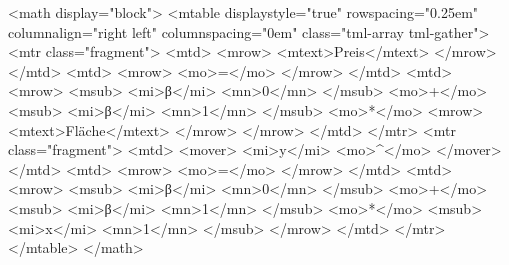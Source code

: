<math display="block">
    <mtable displaystyle="true" rowspacing="0.25em" columnalign="right left" columnspacing="0em" class="tml-array tml-gather">
        <mtr class="fragment">
            <mtd>
                <mrow>
                    <mtext>Preis</mtext>
                </mrow>
            </mtd>
            <mtd>
                <mrow>
                    <mo>=</mo>
                </mrow>
            </mtd>
            <mtd>
                <mrow>
                    <msub>
                        <mi>β</mi>
                        <mn>0</mn>
                    </msub>
                    <mo>+</mo>
                    <msub>
                        <mi>β</mi>
                        <mn>1</mn>
                    </msub>
                    <mo>*</mo>
                    <mrow>
                        <mtext>Fläche</mtext>
                    </mrow>
                </mrow>
            </mtd>
        </mtr>
        <mtr class="fragment">
            <mtd>
                <mover>
                    <mi>y</mi>
                    <mo>^</mo>
                </mover>
            </mtd>
            <mtd>
                <mrow>
                    <mo>=</mo>
                </mrow>
            </mtd>
            <mtd>
                <mrow>
                    <msub>
                        <mi>β</mi>
                        <mn>0</mn>
                    </msub>
                    <mo>+</mo>
                    <msub>
                        <mi>β</mi>
                        <mn>1</mn>
                    </msub>
                    <mo>*</mo>
                    <msub>
                        <mi>x</mi>
                        <mn>1</mn>
                    </msub>
                </mrow>
            </mtd>
        </mtr>
    </mtable>
</math>